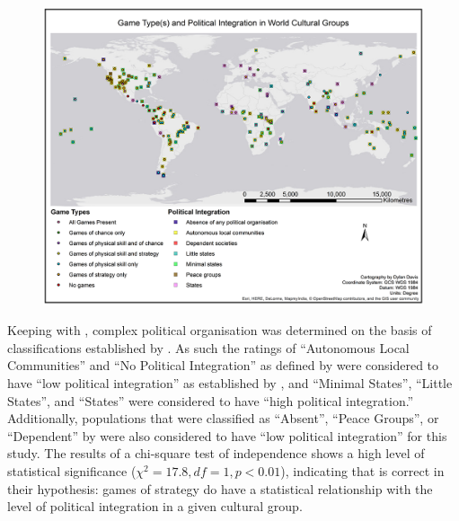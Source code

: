 \documentclass[%
	]{ijsra}
\begin{document}
\begin{figure} [!htb] %
	\includegraphics[width=\linewidth]{figures/Figure3_Davis_082016}
	\caption
	\centering
	\label{fig:Figure3_Davis_082016}
\end{figure}

Keeping with \textcite{roberts1959}, complex political organisation was determined on the basis of classifications established by \textcite{murdock1957}. As such the ratings of ``Autonomous Local Communities” and ``No Political Integration” as defined by \textcite{murdock1959} were considered to have ``low political integration” as established by \textcite{roberts1959}, and ``Minimal States”, ``Little States”, and ``States” were considered to have ``high political integration.” Additionally, populations that were classified as ``Absent”, ``Peace Groups”, or ``Dependent” by \textcite{murdock1957} were also considered to have ``low political integration” for this study. The results of a chi-square test of independence shows a high level of statistical significance ($\chi^{2} = 17.8, df = 1, p < 0.01$), indicating that \textcite{roberts1959} is correct in their hypothesis: games of strategy do have a statistical relationship with the level of political integration in a given cultural group.

\end{document}
